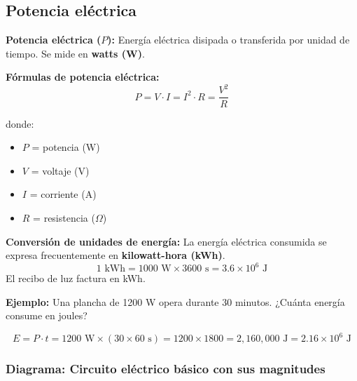 \subsection{Potencia eléctrica}

\begin{seccion}
\begin{definicion}
\textbf{Potencia eléctrica ($P$):} Energía eléctrica disipada o transferida por unidad de tiempo. Se mide en \textbf{watts (W)}.
\end{definicion}

\begin{ecuacion}
\textbf{Fórmulas de potencia eléctrica:}
$$P = V \cdot I = I^2 \cdot R = \frac{V^2}{R}$$

donde:
\begin{itemize}
    \item $P$ = potencia (W)
    \item $V$ = voltaje (V)
    \item $I$ = corriente (A)
    \item $R$ = resistencia ($\Omega$)
\end{itemize}
\end{ecuacion}

\begin{nota}
\textbf{Conversión de unidades de energía:} La energía eléctrica consumida se expresa frecuentemente en \textbf{kilowatt-hora (kWh)}.
$$1 \text{ kWh} = 1000 \text{ W} \times 3600 \text{ s} = 3.6 \times 10^6 \text{ J}$$
El recibo de luz factura en kWh.
\end{nota}

\textbf{Ejemplo:} Una plancha de 1200 W opera durante 30 minutos. ¿Cuánta energía consume en joules?

$$E = P \cdot t = 1200 \text{ W} \times (30 \times 60 \text{ s}) = 1200 \times 1800 = 2{,}160{,}000 \text{ J} = 2.16 \times 10^6 \text{ J}$$
\end{seccion}

\subsubsection{Diagrama: Circuito eléctrico básico con sus magnitudes}

